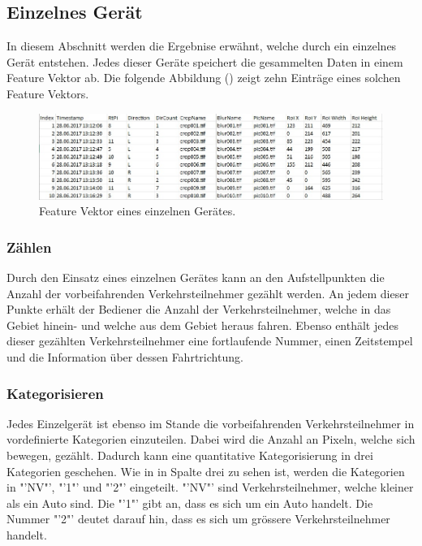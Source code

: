 \subsection{Einzelnes Gerät}
In diesem Abschnitt werden die Ergebnise erwähnt, welche durch ein einzelnes Gerät entstehen. Jedes dieser Geräte speichert die gesammelten Daten in einem Feature Vektor ab. Die folgende Abbildung () zeigt zehn Einträge eines solchen Feature Vektors.

\begin{figure}[H]
  \centering
  \includegraphics[width=1\textwidth]{Resultate/FeatureVector.jpg} 
  \caption{Feature Vektor eines einzelnen Gerätes.}
  \label{bFVec}
\end{figure}

\subsubsection{Zählen}
Durch den Einsatz eines einzelnen Gerätes kann an den Aufstellpunkten die Anzahl der vorbeifahrenden Verkehrsteilnehmer gezählt werden. An jedem dieser Punkte erhält der Bediener die Anzahl der Verkehrsteilnehmer, welche in das Gebiet hinein- und welche  aus dem Gebiet heraus fahren. Ebenso enthält jedes dieser gezählten Verkehrsteilnehmer  eine fortlaufende Nummer, einen Zeitstempel und die Information über dessen Fahrtrichtung.

\subsubsection{Kategorisieren}
Jedes Einzelgerät ist ebenso im Stande die vorbeifahrenden Verkehrsteilnehmer in vordefinierte Kategorien einzuteilen. Dabei wird die Anzahl an Pixeln, welche sich bewegen, gezählt. Dadurch kann eine quantitative Kategorisierung in drei Kategorien geschehen. Wie in  in Spalte drei zu sehen ist, werden die Kategorien in "'NV"', "'1"' und "'2"' eingeteilt. "'NV"' sind Verkehrsteilnehmer, welche kleiner als ein Auto sind. Die "'1"' gibt an, dass es sich um ein Auto handelt. Die Nummer "'2"' deutet darauf hin, dass es sich um grössere Verkehrsteilnehmer handelt.

